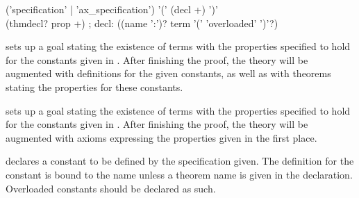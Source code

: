 \begin{isabellebody}
\begin{isamarkuptext}
  \begin{rail}
  ('specification' | 'ax\_specification') '(' (decl +) ')' \\ (thmdecl? prop +)
  ;
  decl: ((name ':')? term '(' 'overloaded' ')'?)
  \end{rail}

  \begin{descr}

  \item [\hyperlink{command.HOL.specification}{\mbox{\isa{\isacommand{specification}}}}~\isa{{\isachardoublequote}decls\ {\isasymphi}{\isachardoublequote}}] sets up a
  goal stating the existence of terms with the properties specified to
  hold for the constants given in .  After finishing the
  proof, the theory will be augmented with definitions for the given
  constants, as well as with theorems stating the properties for these
  constants.

  \item [\hyperlink{command.HOL.ax-specification}{\mbox{\isa{\isacommand{ax{\isacharunderscore}specification}}}}~\isa{{\isachardoublequote}decls\ {\isasymphi}{\isachardoublequote}}] sets
  up a goal stating the existence of terms with the properties
  specified to hold for the constants given in .  After
  finishing the proof, the theory will be augmented with axioms
  expressing the properties given in the first place.

  \item [\isa{decl}] declares a constant to be defined by the
  specification given.  The definition for the constant  is
  bound to the name  unless a theorem name is given in
  the declaration.  Overloaded constants should be declared as such.

  \end{descr}


\end{isamarkuptext}
\end{isabellebody}
